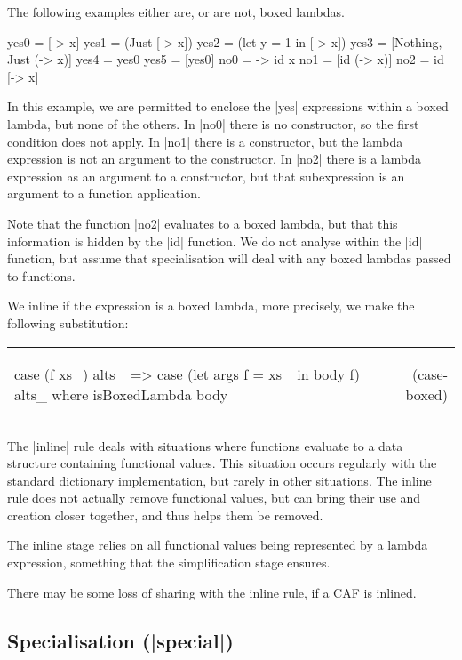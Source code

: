 \documentclass[preprint]{sigplanconf}
\newcommand{\simp}[2]{\vspace{-7mm} #2 & (#1) \\}
\newenvironment{simplify}
    {\noindent
     \begin{flushright}
     \begin{tabular}{p{6.5cm}r}
    }
    {\end{tabular}
     \vspace{-7mm}
     \end{flushright}
    }
\begin{document}
\begin{example}
The following examples either are, or are not, boxed lambdas.

\begin{code}
yes0 = [\x -> x]
yes1 = (Just [\x -> x])
yes2 = (let y = 1 in [\x -> x])
yes3 = [Nothing, Just (\x -> x)]
yes4 = yes0
yes5 = [yes0]
no0 = \x -> id x
no1 = [id (\x -> x)]
no2 = id [\x -> x]
\end{code}

In this example, we are permitted to enclose the |yes| expressions within a boxed lambda, but none of the others. In |no0| there is no constructor, so the first condition does not apply. In |no1| there is a constructor, but the lambda expression is not an argument to the constructor. In |no2| there is a lambda expression as an argument to a constructor, but that subexpression is an argument to a function application.

Note that the function |no2| evaluates to a boxed lambda, but that this information is hidden by the |id| function. We do not analyse within the |id| function, but assume that specialisation will deal with any boxed lambdas passed to functions.
\end{example}

We inline if the expression is a boxed lambda, more precisely, we make the following substitution:

\begin{simplify}

\simp{case-boxed}{
\begin{code}
case (f xs_) alts_
    => case (let args f = xs_ in body f) alts_
    where isBoxedLambda body
\end{code}}

\end{simplify}

The |inline| rule deals with situations where functions evaluate to a data structure containing functional values. This situation occurs regularly with the standard dictionary implementation, but rarely in other situations. The inline rule does not actually remove functional values, but can bring their use and creation closer together, and thus helps them be removed.

The inline stage relies on all functional values being represented by a lambda expression, something that the simplification stage ensures.

There may be some loss of sharing with the inline rule, if a CAF is inlined.

\subsection{Specialisation (|special|)}
\end{document}
